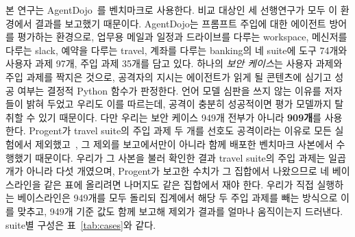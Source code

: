\documentclass[acmsmall,screen,review,anonymous]{acmart}
\begin{document}
본 연구는 AgentDojo~\cite{debenedetti2024agentdojo}를 벤치마크로 사용한다. 비교 대상인 세 선행연구가 모두 이 환경에서 결과를 보고했기 때문이다. AgentDojo는 프롬프트 주입에 대한 에이전트 방어를 평가하는 환경으로, 업무용 메일과 일정과 드라이브를 다루는 workspace, 메신저를 다루는 slack, 예약을 다루는 travel, 계좌를 다루는 banking의 네 suite에 도구 74개와 사용자 과제 97개, 주입 과제 35개를 담고 있다. 하나의 \emph{보안 케이스}는 사용자 과제와 주입 과제를 짝지은 것으로, 공격자의 지시는 에이전트가 읽게 될 콘텐츠에 심기고 성공 여부는 결정적 Python 함수가 판정한다. 언어 모델 심판을 쓰지 않는 이유를 저자들이 밝혀 두었고 우리도 이를 따르는데, 공격이 충분히 성공적이면 평가 모델까지 탈취할 수 있기 때문이다. 다만 우리는 보안 케이스 949개 전부가 아니라 \textbf{909개}를 사용한다. Progent가 travel suite의 주입 과제 두 개를 선호도 공격이라는 이유로 모든 실험에서 제외했고~\cite{shi2025progent}, 그 제외를 보고에서만이 아니라 함께 배포한 벤치마크 사본에서 수행했기 때문이다. 우리가 그 사본을 불러 확인한 결과 travel suite의 주입 과제는 일곱 개가 아니라 다섯 개였으며, Progent가 보고한 수치가 그 집합에서 나왔으므로 네 베이스라인을 같은 표에 올리려면 나머지도 같은 집합에서 재야 한다. 우리가 직접 실행하는 베이스라인은 949개를 모두 돌리되 집계에서 해당 두 주입 과제를 빼는 방식으로 이를 맞추고, 949개 기준 값도 함께 보고해 제외가 결과를 얼마나 움직이는지 드러낸다. suite별 구성은 표~\ref{tab:cases}와 같다.
\end{document}
